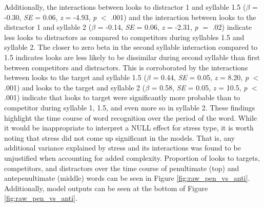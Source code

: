 Additionally, the interactions between looks to distractor 1 and syllable 1.5 ($\beta$ = -0.30, \textit{SE} = 0.06, \textit{z} = -4.93, \textit{p} $<$ .001) and the interaction between looks to the distractor 1 and syllable 2 ($\beta$ = -0.14, \textit{SE} = 0.06, \textit{z} = -2.31, \textit{p} $=$ .02) indicate less looks to distractors as compared to competitors during syllables 1.5 and syllable 2. The closer to zero beta in the second syllable interaction compared to 1.5 indicates looks are less likely to be dissimilar during second syllable than first between competitors and distractors. This is corroborated by the interactions between looks to the target and syllable 1.5 ($\beta$ = 0.44, \textit{SE} = 0.05, \textit{z} = 8.20, \textit{p} $<$ .001) and looks to the target and syllable 2 ($\beta$ = 0.58, \textit{SE} = 0.05, \textit{z} = 10.5, \textit{p} $<$ .001) indicate that looks to target were significantly more probable than to competitor during syllable 1, 1.5, and even more so in syllable 2. These findings highlight the time course of word recognition over the period of the word. While it would be inappropriate to interpret a NULL effect for stress type, it is worth noting that stress did not come up significant in the models. That is, any additional variance explained by stress and its interactions was found to be unjustified when accounting for added complexity. Proportion of looks to targets, competitors, and distractors over the time course of penultimate (top) and antepenultimate (middle) words can be seen in Figure \ref{fig:raw_pen_vs_anti}. Additionally, model outputs can be seen at the bottom of Figure \ref{fig:raw_pen_vs_anti}.

